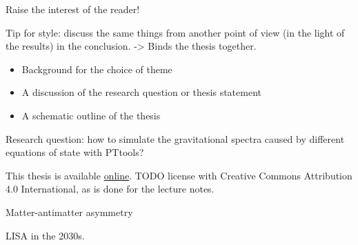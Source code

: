 Raise the interest of the reader!

Tip for style: discuss the same things from another point of view (in the light of the results) in the conclusion.
-> Binds the thesis together.

\begin{itemize}
    \item Background for the choice of theme
    \item A discussion of the research question or thesis statement
    \item A schematic outline of the thesis
\end{itemize}

Research question: how to simulate the gravitational spectra caused by different equations of state with PTtools?

This thesis is available \href{https://gitlab.com/AgenttiX/msc-thesis2}{online}.
TODO license with Creative Commons Attribution 4.0 International, as is done for the lecture notes.

Matter-antimatter asymmetry \cite{lecture_notes}

LISA in the 2030s.
